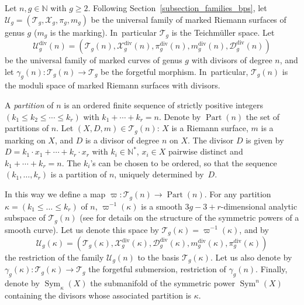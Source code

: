 \documentclass[JEP,XML,SOM,Unicode,NoEqCountersInSection,published]{cedram}
\newcommand{\N}{\mathbb N}
\DeclareMathOperator{\Div}{div}
\DeclareMathOperator{\Part}{Part}
\DeclareMathOperator{\Sym}{Sym}
\theoremstyle{definition}
\theoremstyle{plain}
\begin{document}
Let $n, g \in \N$ with $g \ge 2$.
Following Section~\ref{subsection_families_bps}, let $\mathcal U_g = \left(\mathcal T_g, \mathcal X_g, \pi_g, m_g\right)$ be the universal family of marked Riemann surfaces of genus $g$ ($m_g$ is the marking). In~particular $\mathcal T_g$ is the Teichmüller space.
Let
\[
\mathcal U_g^{\Div}(n) = \left(\mathcal T_g(n), \mathcal X_g^{\Div}(n), \pi_g^{\Div}(n), m_g^{\Div}(n), \mathcal D_g^{\Div}(n)\right)
\]
be the universal family of marked curves of genus $g$ with divisors of degree $n$, and let $\gamma_g(n): \mathcal T_g(n) \to \mathcal T_g$ be the forgetful morphism. In~particular, $\mathcal T_g(n)$ is the moduli space of marked Riemann surfaces with divisors.

A \emph{partition} of $n$ is an ordered finite sequence of strictly positive integers $(k_1 \le k_2 \le \cdots \le k_r)$ with $k_1 + \cdots + k_r = n$.
Denote by $\Part(n)$ the set of partitions of $n$.
Let $(X, D, m) \in \mathcal T_g(n)$: $X$ is a Riemann surface, $m$ is a marking on $X$, and $D$ is a divisor of degree $n$ on $X$.
The divisor $D$ is given by $D = k_1 \cdot x_1 + \cdots + k_r \cdot x_r$ with $k_i \in \N^*$, $x_i \in X$ pairwise distinct and $k_1 + \cdots + k_r = n$.
The $k_i$'s can be chosen to be ordered, so that the sequence $(k_1, \dots, k_r)$ is a partition of $n$, uniquely determined by~$D$.

In this way we define a map $\varpi: \mathcal T_g(n) \to \Part(n)$.
For any partition $\kappa = (k_1 \le \dots \le k_r)$ of $n$, $\varpi^{-1}(\kappa)$ is a smooth $3g-3+r$-dimensional analytic subspace of $\mathcal T_g(n)$ (see \cite{barlet-magnusson} for details on the structure of the symmetric powers of a smooth curve).
Let us denote this space by $\mathcal T_g(\kappa) = \varpi^{-1}(\kappa)$, and by
\[
\mathcal U_g(\kappa) = \left(\mathcal T_g(\kappa), \mathcal X_g^{\Div}(\kappa), \mathcal D_g^{\Div}(\kappa), m_g^{\Div}(\kappa), \pi_g^{\Div}(\kappa)\right)
\]
the restriction of the family $\mathcal U_g(n)$ to the basis $\mathcal T_g(\kappa)$.
Let us also denote by $\gamma_g(\kappa): \mathcal T_g(\kappa) \to \mathcal T_g$ the forgetful submersion, restriction of $\gamma_g(n)$.
Finally, denote by $\Sym_{\kappa}(X)$ the submanifold of the symmetric power $\Sym^n(X)$ containing the divisors whose associated partition is $\kappa$.
\end{document}
